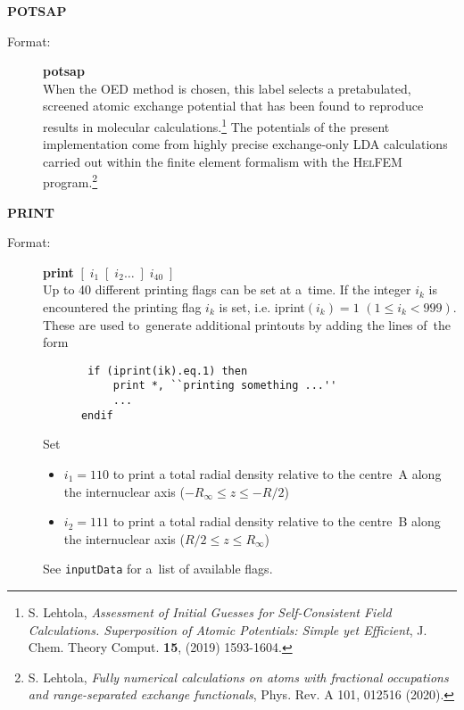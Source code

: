 \documentclass[10pt,a4paper]{article}
\newcommand{\ft}[1]{\texttt{#1}}
\begin{document}
\begin{description}
\item \textbf{POTSAP}
\begin{description}
\item[Format:] \textbf{potsap} \\ When the OED method is chosen, this
  label selects a pretabulated, screened atomic exchange potential
  that has been found to reproduce results in molecular
  calculations.\footnote{S. Lehtola, \textsl{Assessment of Initial
    Guesses for Self-Consistent Field Calculations. Superposition of
    Atomic Potentials: Simple yet Efficient}, J. Chem. Theory
  Comput. \textbf{15}, (2019)
  1593-1604. } The potentials of the
  present implementation come from highly precise exchange-only LDA
  calculations carried out within the finite element formalism with
  the \textsc{HelFEM} program.\footnote{S. Lehtola, \textsl{Fully
    numerical calculations on atoms with fractional occupations and
    range-separated exchange functionals}, Phys. Rev. A 101, 012516
  (2020). }
\end{description}

\item \textbf{PRINT}
\begin{description}
\item[Format:] \textbf{print} $[\; i_1 \; [\;i_2 \ldots \;] \;i_{40}\;]$ \\ Up to 40
  different printing flags can be set at a~time. If the integer $i_k$ is encountered the
  printing flag $i_k$ is set, i.e. iprint$(i_k)=1$ $(1 \leq i_k<999)$. These are used
  to~generate additional printouts by adding the lines of~the form
  \begin{verbatim}
       if (iprint(ik).eq.1) then
           print *, ``printing something ...''
           ...
      endif
    \end{verbatim}

Set
\begin{itemize}
\item $i_1=110$ to print a total radial density relative to the
  centre~A along the internuclear axis ($-R_{\infty}\le z\le -R/2$)

\item $i_2=111$ to print a total radial density relative to the
  centre~B along the internuclear axis ($R/2\le z\le R_{\infty}$)
\end{itemize}
See \ft{inputData} for a~list of available flags.

\end{description}



\end{description}
\end{document}
